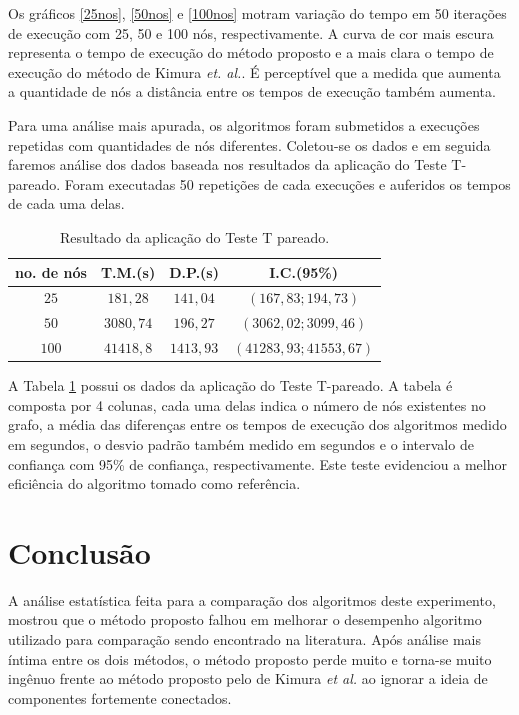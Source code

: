 \documentclass{acm_proc_article-sp}
\begin{document}
Os gráficos \ref{25nos}, \ref{50nos} e \ref{100nos} motram variação do tempo em 50 iterações de execução
com 25, 50 e 100 nós, respectivamente. A curva de cor mais escura representa o tempo de execução do método
proposto e a mais clara o tempo de execução do método de Kimura \textit{et. al.}. É perceptível que a medida que
aumenta a quantidade de nós a distância entre os tempos de execução também aumenta.

Para uma análise mais apurada, os algoritmos foram submetidos a execuções repetidas com quantidades de nós
diferentes. Coletou-se os dados e em seguida faremos análise dos dados baseada nos resultados da aplicação do Teste
T-pareado. Foram executadas 50 repetições de cada execuções e auferidos os tempos de cada uma delas.

\begin{table}[!h] \label{tabpareado}
\centering
\begin{tabular}{|c|c|c|c|}
\hline 
\hline\textbf{no. de nós}  & \textbf{T.M.(s)} & \textbf{D.P.(s)} &\textbf{I.C.(95\%) }\\
\hline 
\hline \textbf{$25$}   & $181,28$  & $141,04$ & $(167,83; 194,73)$\\
\hline \textbf{$50$}   & $3080,74$  & $196,27$ & $(3062,02; 3099,46)$\\
\hline \textbf{$100$}  & $41418,8$ & $1413,93$ & $(41283,93; 41553,67)$\\
\hline \hline
\end{tabular}
\caption{Resultado da aplicação do Teste T pareado.}
\end{table}

A Tabela \ref{tabpareado} possui os dados da aplicação do Teste T-pareado. A tabela é composta por 4 colunas, cada
uma delas indica o número de nós existentes no grafo, a média das diferenças entre os tempos de execução dos
algoritmos medido em segundos, o desvio padrão também medido em segundos e o intervalo de confiança com 95\% de
confiança, respectivamente. Este teste evidenciou a melhor eficiência do algoritmo tomado como referência.


\section{Conclusão}
A análise estatística feita para a comparação dos algoritmos deste experimento, mostrou que o método proposto
falhou em melhorar o desempenho algoritmo utilizado para comparação sendo encontrado na literatura. Após análise
mais íntima entre os dois métodos, o método proposto perde muito e torna-se muito ingênuo frente ao método proposto
pelo de Kimura \textit{et al.} ao ignorar a ideia de componentes fortemente conectados.
\end{document}
